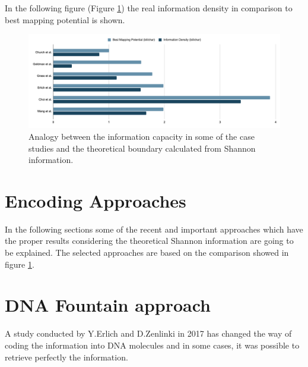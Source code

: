 \documentclass[10pt,twocolumn,twoside]{gsajnl}
\theoremstyle{definition}
\begin{document}
In the following figure (Figure \ref{fig7})  the real information density in comparison to best mapping potential is shown.
\begin{figure}[ht]
    \centering
    \includegraphics[width=\linewidth]{Figures/information.png}
    \caption{Analogy between the information capacity in some of the case studies and the theoretical boundary calculated from Shannon information.}
    \label{fig7}
\end{figure}


\section{Encoding Approaches}
\label{sec: Encoding Approaches}
In the following sections some of the recent and important approaches which have the proper results considering the theoretical Shannon information are going to be explained. The selected approaches are based on the comparison showed in figure \ref{fig7}.

\section{DNA Fountain approach}
A study conducted by Y.Erlich and D.Zenlinki in 2017 has changed the way of coding the information into DNA molecules and in some cases, it was possible to retrieve perfectly the information.
\end{document}
